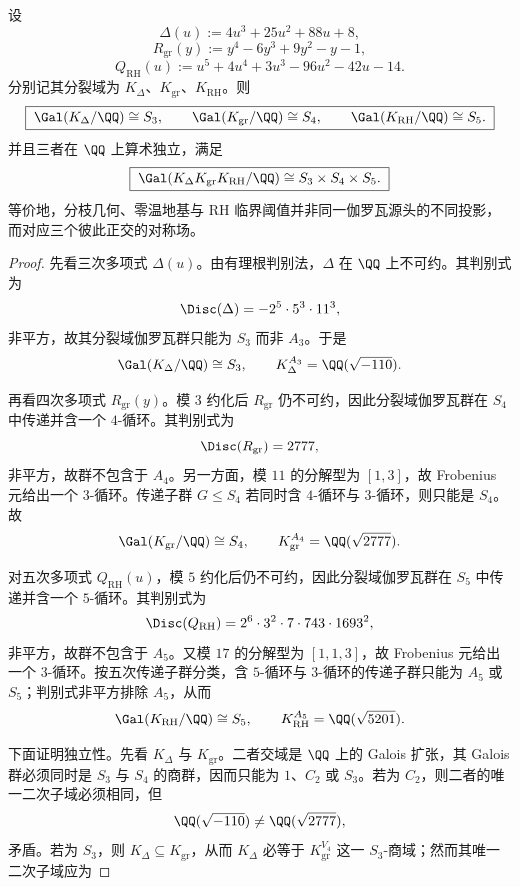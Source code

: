 \begin{theorem}\label{thm:xi-branch-rh-zero-temp-arithmetic-independence}
设
\[
\Delta(u):=4u^3+25u^2+88u+8,
\]
\[
R_{\mathrm{gr}}(y):=y^4-6y^3+9y^2-y-1,
\]
\[
Q_{\mathrm{RH}}(u):=u^5+4u^4+3u^3-96u^2-42u-14.
\]
分别记其分裂域为 \(K_\Delta\)、\(K_{\mathrm{gr}}\)、\(K_{\mathrm{RH}}\)。则
\[
\boxed{\;
\Gal(K_\Delta/\QQ)\cong S_3,\qquad
\Gal(K_{\mathrm{gr}}/\QQ)\cong S_4,\qquad
\Gal(K_{\mathrm{RH}}/\QQ)\cong S_5.\;}
\]
并且三者在 \(\QQ\) 上算术独立，满足
\[
\boxed{\;
\Gal(K_\Delta K_{\mathrm{gr}}K_{\mathrm{RH}}/\QQ)
\cong
S_3\times S_4\times S_5.\;}
\]
等价地，分枝几何、零温地基与 RH 临界阈值并非同一伽罗瓦源头的不同投影，而对应三个彼此正交的对称场。
\end{theorem}
\begin{proof}
先看三次多项式 \(\Delta(u)\)。由有理根判别法，\(\Delta\) 在 \(\QQ\) 上不可约。其判别式为
\[
\Disc(\Delta)=-2^5\cdot 5^3\cdot 11^3,
\]
非平方，故其分裂域伽罗瓦群只能为 \(S_3\) 而非 \(A_3\)。于是
\[
\Gal(K_\Delta/\QQ)\cong S_3,
\qquad
K_\Delta^{A_3}=\QQ(\sqrt{-110}).
\]
\par
再看四次多项式 \(R_{\mathrm{gr}}(y)\)。模 \(3\) 约化后 \(R_{\mathrm{gr}}\) 仍不可约，因此分裂域伽罗瓦群在 \(S_4\) 中传递并含一个 \(4\)-循环。其判别式为
\[
\Disc(R_{\mathrm{gr}})=2777,
\]
非平方，故群不包含于 \(A_4\)。另一方面，模 \(11\) 的分解型为 \([1,3]\)，故 Frobenius 元给出一个 \(3\)-循环。传递子群 \(G\le S_4\) 若同时含 \(4\)-循环与 \(3\)-循环，则只能是 \(S_4\)。故
\[
\Gal(K_{\mathrm{gr}}/\QQ)\cong S_4,
\qquad
K_{\mathrm{gr}}^{A_4}=\QQ(\sqrt{2777}).
\]
\par
对五次多项式 \(Q_{\mathrm{RH}}(u)\)，模 \(5\) 约化后仍不可约，因此分裂域伽罗瓦群在 \(S_5\) 中传递并含一个 \(5\)-循环。其判别式为
\[
\Disc(Q_{\mathrm{RH}})
=
2^6\cdot 3^2\cdot 7\cdot 743\cdot 1693^2,
\]
非平方，故群不包含于 \(A_5\)。又模 \(17\) 的分解型为 \([1,1,3]\)，故 Frobenius 元给出一个 \(3\)-循环。按五次传递子群分类，含 \(5\)-循环与 \(3\)-循环的传递子群只能为 \(A_5\) 或 \(S_5\)；判别式非平方排除 \(A_5\)，从而
\[
\Gal(K_{\mathrm{RH}}/\QQ)\cong S_5,
\qquad
K_{\mathrm{RH}}^{A_5}=\QQ(\sqrt{5201}).
\]
\par
下面证明独立性。先看 \(K_\Delta\) 与 \(K_{\mathrm{gr}}\)。二者交域是 \(\QQ\) 上的 Galois 扩张，其 Galois 群必须同时是 \(S_3\) 与 \(S_4\) 的商群，因而只能为 \(1\)、\(C_2\) 或 \(S_3\)。若为 \(C_2\)，则二者的唯一二次子域必须相同，但
\[
\QQ(\sqrt{-110})\neq \QQ(\sqrt{2777}),
\]
矛盾。若为 \(S_3\)，则 \(K_\Delta\subseteq K_{\mathrm{gr}}\)，从而 \(K_\Delta\) 必等于 \(K_{\mathrm{gr}}^{V_4}\) 这一 \(S_3\)-商域；然而其唯一二次子域应为

\end{proof}
